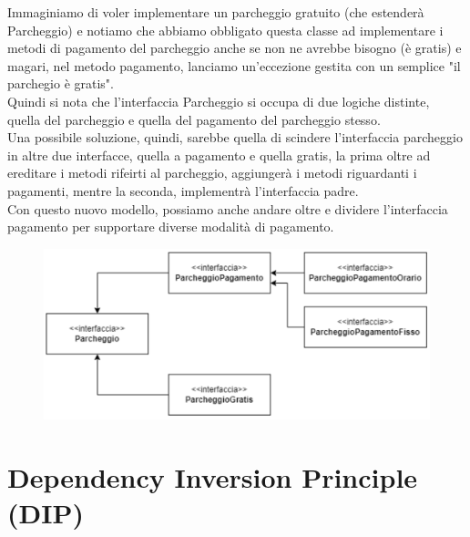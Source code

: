 Immaginiamo di voler implementare un parcheggio gratuito (che estenderà Parcheggio) e notiamo che abbiamo obbligato questa classe ad implementare i metodi di pagamento del parcheggio anche se non ne avrebbe bisogno (è gratis) e magari, nel metodo pagamento, lanciamo un'eccezione gestita con un semplice "il parchegio è gratis".\\
Quindi si nota che l'interfaccia Parcheggio si occupa di due logiche distinte, quella del parcheggio e quella del pagamento del parcheggio stesso.\\
Una possibile soluzione, quindi, sarebbe quella di scindere l'interfaccia parcheggio in altre due interfacce, quella a pagamento e quella gratis, la prima oltre ad ereditare i metodi rifeirti al parcheggio, aggiungerà i metodi riguardanti i pagamenti, mentre la seconda, implementrà l'interfaccia padre.\\
Con questo nuovo modello, possiamo anche andare oltre e dividere l'interfaccia pagamento per supportare diverse modalità di pagamento.\\

\begin{figure}[h]
  \centering
  \includegraphics[width=0.5\linewidth]{../immagini/principio_SOLID/refactoring_interfaccia}
\end{figure}

\section{Dependency Inversion Principle (DIP)}

